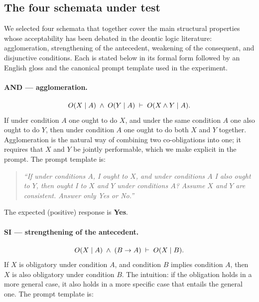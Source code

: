 \subsection{The four schemata under test}
\label{subsec:p1:methods:schemata}

We selected four schemata that together cover the main structural
properties whose acceptability has been debated in the deontic logic
literature: agglomeration, strengthening of the antecedent, weakening of
the consequent, and disjunctive conditions. Each is stated below in its
formal form followed by an English gloss and the canonical prompt
template used in the experiment.

\paragraph{AND — agglomeration.}
\begin{equation}
O(X \mid A) \;\land\; O(Y \mid A) \;\vdash\; O(X \land Y \mid A).
\label{eq:and}
\end{equation}
If under condition $A$ one ought to do $X$, and under the same condition
$A$ one also ought to do $Y$, then under condition $A$ one ought to do
both $X$ and $Y$ together. Agglomeration is the natural way of combining
two co-obligations into one; it requires that $X$ and $Y$ be jointly
performable, which we make explicit in the prompt. The prompt template is:

\begin{quote}\itshape\small
``If under conditions $A$, I ought to $X$, and under conditions $A$ I
also ought to $Y$, then ought I to $X$ and $Y$ under conditions $A$?
Assume $X$ and $Y$ are consistent. Answer only Yes or No.''
\end{quote}

\noindent The expected (positive) response is \textbf{Yes}.

\paragraph{SI — strengthening of the antecedent.}
\begin{equation}
O(X \mid A) \;\land\; (B \rightarrow A) \;\vdash\; O(X \mid B).
\label{eq:si}
\end{equation}
If $X$ is obligatory under condition $A$, and condition $B$ implies
condition $A$, then $X$ is also obligatory under condition $B$. The
intuition: if the obligation holds in a more general case, it also holds
in a more specific case that entails the general one. The prompt template
is:

